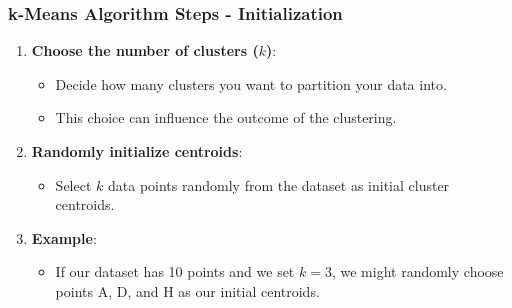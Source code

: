 \documentclass[aspectratio=169]{beamer}
\begin{document}
\begin{frame}[fragile]
    \frametitle{k-Means Algorithm Steps - Initialization}
    \begin{enumerate}
        \item \textbf{Choose the number of clusters (\( k \))}:
        \begin{itemize}
            \item Decide how many clusters you want to partition your data into.
            \item This choice can influence the outcome of the clustering.
        \end{itemize}
    
        \item \textbf{Randomly initialize centroids}:
        \begin{itemize}
            \item Select \( k \) data points randomly from the dataset as initial cluster centroids.
        \end{itemize}
        
        \item \textbf{Example}:
        \begin{itemize}
            \item If our dataset has 10 points and we set \( k=3 \), we might randomly choose points A, D, and H as our initial centroids.
        \end{itemize}
    \end{enumerate}
\end{frame}
\end{document}
